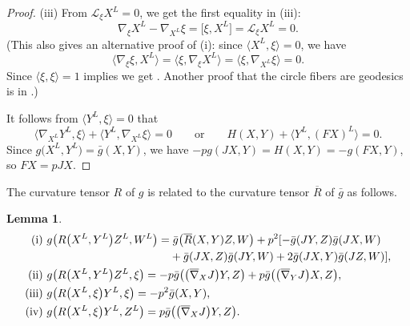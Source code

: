 \documentclass[pdftex]{sigma}
\numberwithin{equation}{section}
\newtheorem{Lemma}[Theorem]{Lemma}
\theoremstyle{definition}
\newcommand{\bn}{\nabla}
\newcommand{\bbn}{\overline{\nabla}}
\newcommand{\bxi}{\xi}
\newcommand{\br}{ R}
\newcommand{\brr}{\overline R}
\newcommand{\bgg}{\bar g}
\newcommand{\bg}{ g}
\newcommand{\xl}{X^L}
\newcommand{\yl}{Y^L}
\newcommand{\zl}{Z^L}
\begin{document}
\begin{proof}
(iii)
From $\mathcal{L}_{\xi} X^{L}=0$, we get the first equality in (iii):
\[\nabla_{\xi} X^{L} - \nabla_{X^{L}} \xi = \bigl[\xi, X^{L}\bigr] =
\mathcal{L}_{\xi} X^{L}=0.\]
(This also gives an alternative proof of (i): since $\bigl\langle \xl,\bxi\bigr\rangle = 0$, we have
\[\bigl\langle \bn_{\bxi}\bxi, \xl\bigr\rangle = \bigl\langle \bxi, \bn_{\bxi} \xl\bigr\rangle = \langle \bxi, \bn_{\xl} \bxi \rangle = 0.\]
Since $\langle\xi, \xi\rangle=1$ implies
 we get
\smash{$\bn_{\bxi}\bxi = 0$}. Another proof that the circle fibers are geodesics is in
\cite[Theorem 5.2.13]{Klingenberg}.)

It follows from $\bigl\langle Y^{L}, \xi\bigr\rangle=0$ that
\[
\bigl\langle\nabla_{X^{L}}Y^{L}, \xi\bigr\rangle + \bigl\langle Y^{L}, \nabla_{X^{L}}\xi\bigr\rangle = 0 \qquad \text{or}\qquad
H(X,Y) + \bigl\langle Y^{L}, (F X)^{L}\bigr\rangle=0.\]
Since $\bg\bigl(X^L, \yl\bigr) = \bgg(X,Y)$, we have
$-pg(JX,Y) = H(X,Y) = -g(FX, Y)$, so $FX = pJX$.
\end{proof}

The curvature tensor $\br$ of $\bg$ is related to the curvature tensor $\brr$ of $\bar g$ as follows.

\begin{Lemma} \label{lem1}
\begin{align*} {\rm (i)}\ & \bg\bigl(\br\bigl(X^L, Y^L\bigr)\zl,W^L\bigr) =
 \bgg\bigl( \brr(X,Y)Z,W\bigr) + p^2[-\bgg( JY,Z)\bgg( JX,W)\\
&\hphantom{ \bg\bigl(\br\bigl(X^L, Y^L\bigr)\zl,W^L\bigr) =}{}
+\bgg( JX,Z)\bgg( JY,W) +2\bgg( JX,Y)\bgg( JZ,W)],\\
{\rm (ii)}\ & \bg\bigl(\br\bigl(\xl, \yl\bigr)\zl, \bxi\bigr) = - p \bgg\bigl(\bigl(\bbn_{X} J\bigr) Y, Z\bigr)
+ p \bgg\bigl(\bigl(\bbn_{Y} J\bigr) X, Z\bigr),\\
{\rm (iii)}\ & \bg\bigl(\br\bigl(\xl,\bxi\bigr)\yl,\bxi\bigr) = -p^2\bgg(X,Y),\\
{\rm (iv)}\ & \bg\bigl(\br\bigl(\xl, \bxi\bigr)\yl, \zl\bigr) = p\bgg\bigl(\bigl(\bbn_XJ\bigr)Y,Z\bigr).
\end{align*}
\end{Lemma}
\end{document}
